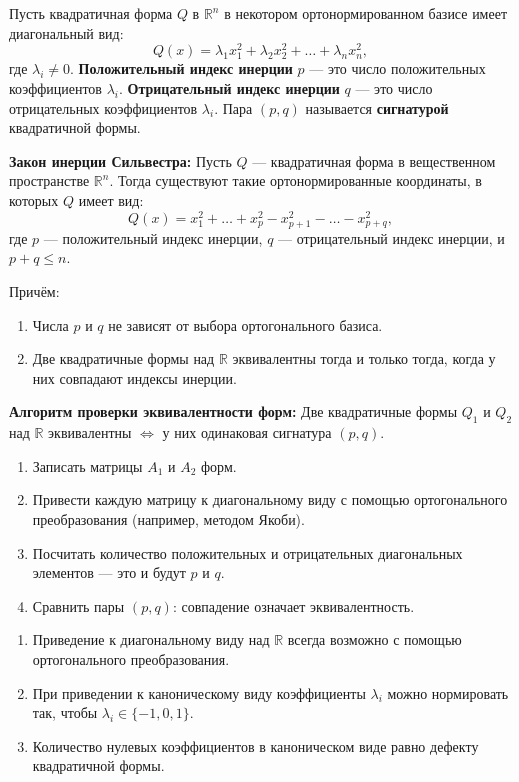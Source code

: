 \documentclass[12pt]{article}
\begin{document}
\begin{definitionbox}
Пусть квадратичная форма $Q$ в $\mathbb{R}^n$ в некотором ортонормированном базисе имеет диагональный вид:
$$
Q(x) = \lambda_1 x_1^2 + \lambda_2 x_2^2 + \dots + \lambda_n x_n^2,
$$
где $\lambda_i \neq 0$.  
\textbf{Положительный индекс инерции} $p$ — это число положительных коэффициентов $\lambda_i$.  
\textbf{Отрицательный индекс инерции} $q$ — это число отрицательных коэффициентов $\lambda_i$.  
Пара $(p, q)$ называется \textbf{сигнатурой} квадратичной формы.
\end{definitionbox}

\begin{theorembox}
\textbf{Закон инерции Сильвестра:} Пусть $Q$ — квадратичная форма в вещественном пространстве $\mathbb{R}^n$. Тогда существуют такие ортонормированные координаты, в которых $Q$ имеет вид:
$$
Q(x) = x_1^2 + \dots + x_p^2 - x_{p+1}^2 - \dots - x_{p+q}^2,
$$
где $p$ — положительный индекс инерции, $q$ — отрицательный индекс инерции, и $p+q \le n$.

Причём:
\begin{enumerate}
    \item Числа $p$ и $q$ не зависят от выбора ортогонального базиса.
    \item Две квадратичные формы над $\mathbb{R}$ эквивалентны тогда и только тогда, когда у них совпадают индексы инерции.
\end{enumerate}
\end{theorembox}

\begin{theorembox}
\textbf{Алгоритм проверки эквивалентности форм:} Две квадратичные формы $Q_1$ и $Q_2$ над $\mathbb{R}$ эквивалентны $\iff$ у них одинаковая сигнатура $(p, q)$.
\begin{enumerate}
    \item Записать матрицы $A_1$ и $A_2$ форм.
    \item Привести каждую матрицу к диагональному виду с помощью ортогонального преобразования (например, методом Якоби).
    \item Посчитать количество положительных и отрицательных диагональных элементов — это и будут $p$ и $q$.
    \item Сравнить пары $(p, q)$: совпадение означает эквивалентность.
\end{enumerate}
\end{theorembox}

\begin{remarkbox}
\begin{enumerate}
    \item Приведение к диагональному виду над $\mathbb{R}$ всегда возможно с помощью ортогонального преобразования.
    \item При приведении к каноническому виду коэффициенты $\lambda_i$ можно нормировать так, чтобы $\lambda_i \in \{-1, 0, 1\}$.
    \item Количество нулевых коэффициентов в каноническом виде равно дефекту квадратичной формы.
\end{enumerate}
\end{remarkbox}
\end{document}
